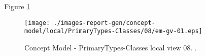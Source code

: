Figure \ref{fig:lu.uni.lassy.excalibur.examples.icrash-CM-view-local-PrimaryTypes-Classes-08} 



\begin{figure}[htbp] 
\label{fig:lu.uni.lassy.excalibur.examples.icrash-CM}
\begin{center}
\texttt{[image: ./images-report-gen/concept-model/local/PrimaryTypes-Classes/08/em-gv-01.eps]}
\end{center}
\caption[Concept Model - PrimaryTypes-Classes local view 08 - ]{Concept Model - PrimaryTypes-Classes local view 08. .}
\label{fig:lu.uni.lassy.excalibur.examples.icrash-CM-view-local-PrimaryTypes-Classes-08}
\end{figure}
\vspace{0.5cm} 
